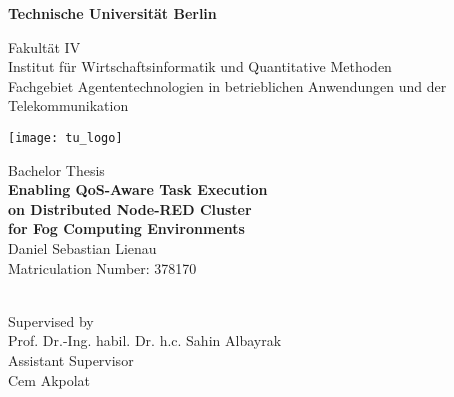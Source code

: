 \thispagestyle{empty}
\begin{center}

{\LARGE \textbf{Technische Universität Berlin}}

\vspace{0.5cm}

{\large Fakultät IV\\[1mm]}
{\large Institut für Wirtschaftsinformatik und Quantitative Methoden\\[1mm]}
{\large Fachgebiet Agententechnologien in betrieblichen Anwendungen und der Telekommunikation\\[5mm]}

\vspace*{1cm}

\texttt{[image: tu\_logo]}

\vspace*{1.0cm}

{\LARGE Bachelor Thesis}\\

\vspace{1.0cm}
{\LARGE \textbf{Enabling QoS-­Aware Task Execution}}\\
\vspace*{0.3cm}
{\LARGE \textbf{on Distributed Node­-RED Cluster}}\\
\vspace*{0.3cm}
{\LARGE \textbf{for Fog Computing Environments}}\\
\vspace*{1.0cm}
{\LARGE Daniel Sebastian Lienau}
\\
\vspace*{0.5cm}
Matriculation Number: 378170\\
\todayGerman\\ %
\vspace*{1.0cm}

Supervised by\\
Prof. Dr.-Ing. habil. Dr. h.c. Sahin Albayrak\\
\vspace*{0.5cm}
Assistant Supervisor\\
Cem Akpolat


\end{center}
